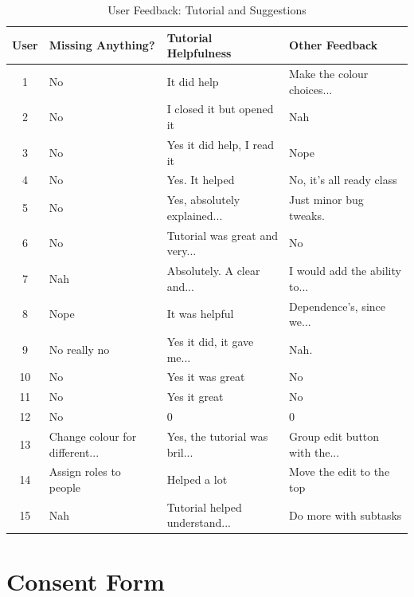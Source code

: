 \documentclass[12pt,nonacm,acmlarge,titlepage,screen]{acmart}
\begin{document}
\clearpage

\begin{table}[H]
    \centering
    \small
    \renewcommand{\arraystretch}{1.4}

    \begin{tabularx}{\textwidth}{| c | X | X | X |}
        \hline
        \textbf{User} & \textbf{Missing Anything?} & \textbf{Tutorial Helpfulness} & \textbf{Other Feedback} \\
        \hline
        1 & No & It did help & Make the colour choices... \\ \hline
        2 & No & I closed it but opened it & Nah \\ \hline
        3 & No & Yes it did help, I read it & Nope \\ \hline
        4 & No & Yes. It helped & No, it's all ready class \\ \hline
        5 & No & Yes, absolutely explained... & Just minor bug tweaks. \\ \hline
        6 & No & Tutorial was great and very... & No \\ \hline
        7 & Nah & Absolutely. A clear and... & I would add the ability to... \\ \hline
        8 & Nope & It was helpful & Dependence's, since we... \\ \hline
        9 & No really no & Yes it did, it gave me... & Nah. \\ \hline
        10 & No & Yes it was great & No \\ \hline
        11 & No & Yes it great & No \\ \hline
        12 & No & 0 & 0 \\ \hline
        13 & Change colour for different... & Yes, the tutorial was bril... & Group edit button with the... \\ \hline
        14 & Assign roles to people & Helped a lot & Move the edit to the top \\ \hline
        15 & Nah & Tutorial helped understand... & Do more with subtasks \\ \hline
    \end{tabularx}
    \caption{User Feedback: Tutorial and Suggestions}
    \label{tab:qualitative_feedback_2}
\end{table}

\clearpage
\section{Consent Form}
\end{document}
